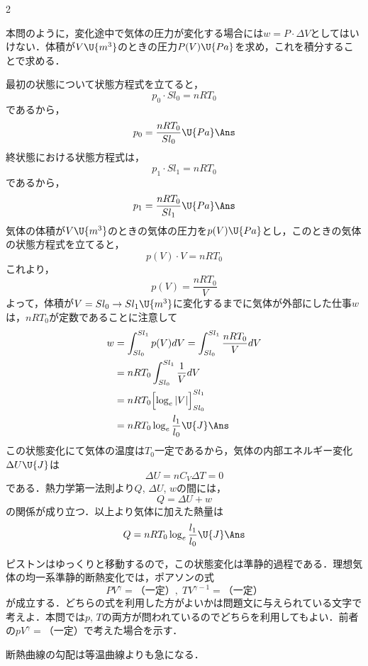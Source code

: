 \begin{multicols}{2}
\par\nopagebreak
\begin{sisin}
本問のように，変化途中で気体の圧力が変化する場合には$w=P\cdot\Delta V$としてはいけない．体積が$V\U{m^3}$のときの圧力$P(V)\U{Pa}$を求め，これを積分することで求める．
\end{sisin}
\KaiHead
\begin{komon}
 最初の状態について状態方程式を立てると，
       \[p_0\cdot Sl_0=nRT_0\]
       であるから，
       \[p_0=\frac{nRT_0}{Sl_0}\U{Pa}\Ans\]
 終状態における状態方程式は，
       \[p_1\cdot Sl_1=nRT_0\]
       であるから，
       \[p_1=\frac{nRT_0}{Sl_1}\U{Pa}\Ans\]
 気体の体積が$V\U{m^3}$のときの気体の圧力を$p(V)\U{Pa}$とし，このときの気体の状態方程式を立てると，
       \[p(V)\cdot V=nRT_0\]
       これより，
       \[p(V)=\frac{nRT_0}{V}\]
       よって，体積が$V=Sl_0\rightarrow Sl_1\U{m^3}$に変化するまでに気体が外部にした仕事$w$は，$nRT_0$が定数であることに注意して
       \[\begin{aligned}
         w&=\int_{Sl_0}^{Sl_1}p(V)dV=\int_{Sl_0}^{Sl_1}\frac{nRT_0}{V}dV\\
          &=nRT_0\int_{Sl_0}^{Sl_1}\frac{1}{V}dV\\
          &=nRT_0\Bigl[\log_e|V|\Bigr]_{Sl_0}^{Sl_1}\\
          &=nRT_0\log_e\frac{l_1}{l_0}\U{J}\Ans
       \end{aligned}\]
 この状態変化にて気体の温度は$T_0$一定であるから，気体の内部エネルギー変化$\Delta U\U{J}$は
       \[\Delta U=nC_V\Delta T=0\]
       である．熱力学第一法則より$Q$, $\Delta U$, $w$の間には，
       \[Q=\Delta U+w\]
       の関係が成り立つ．以上より気体に加えた熱量は
       \[Q=nRT_0\log_e\frac{l_1}{l_0}\U{J}\Ans\]
\end{komon}

\par\nopagebreak
\begin{sisin}
ピストンはゆっくりと移動するので，この状態変化は準静的過程である．理想気体の均一系準静的断熱変化では，ポアソンの式
\[PV^\gamma=（一定）,\;TV^{\gamma-1}=（一定）\]
が成立する．どちらの式を利用した方がよいかは問題文に与えられている文字で考えよ．本問では$p$, $T$の両方が問われているのでどちらを利用してもよい．前者の$pV^\gamma=（一定）$で考えた場合を示す．

断熱曲線の勾配は等温曲線よりも急になる．


\end{sisin}
\end{multicols}
